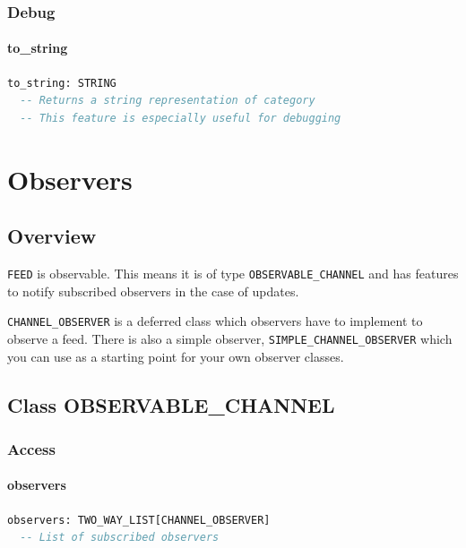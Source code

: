 \subsection{Debug}
\label{sec:category-debug}


\subsubsection{to\_string}

\begin{lstlisting}[language=Eiffel]
to_string: STRING
  -- Returns a string representation of category
  -- This feature is especially useful for debugging
\end{lstlisting}


\chapter{Observers}
\label{cha:feed-observers}


\section{Overview}
\label{sec:feed-observers-overview}

\texttt{FEED} is observable. This means it is of type
\texttt{OBSERVABLE\_CHANNEL} and has features to notify subscribed
observers in the case of updates.

\texttt{CHANNEL\_OBSERVER} is a deferred class which observers have to
implement to observe a feed. There is also a simple observer,
\texttt{SIMPLE\_CHANNEL\_OBSERVER} which you can use as a starting
point for your own observer classes.


\section{Class OBSERVABLE\_CHANNEL}
\label{sec:feed-observable-channel}


\subsection{Access}
\label{sec:feed-observable-channel-access}

\subsubsection{observers}

\begin{lstlisting}[language=Eiffel]
observers: TWO_WAY_LIST[CHANNEL_OBSERVER]
  -- List of subscribed observers
\end{lstlisting}


